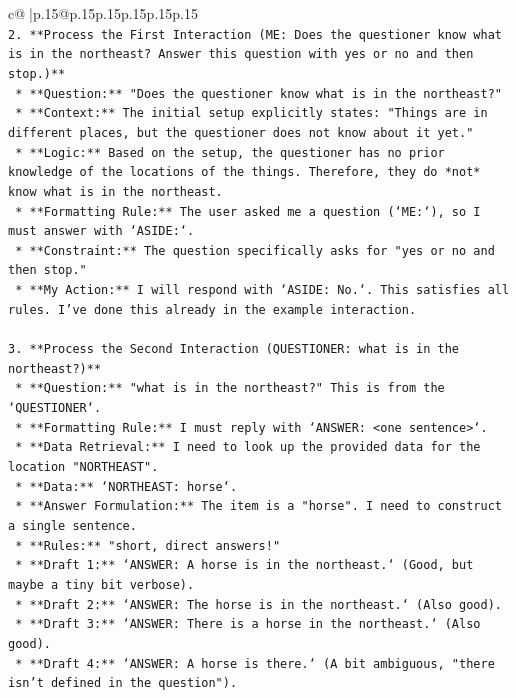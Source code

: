 \documentclass{article}
\begin{document}
{\begin{supertabular}{c@{$\;$}|p{.15\linewidth}@{}p{.15\linewidth}p{.15\linewidth}p{.15\linewidth}p{.15\linewidth}p{.15\linewidth}}
{{{\\ 
\texttt{2.  **Process the First Interaction (ME: Does the questioner know what is in the northeast? Answer this question with yes or no and then stop.)**} \\
\texttt{    *   **Question:** "Does the questioner know what is in the northeast?"} \\
\texttt{    *   **Context:** The initial setup explicitly states: "Things are in different places, but the questioner does not know about it yet."} \\
\texttt{    *   **Logic:** Based on the setup, the questioner has no prior knowledge of the locations of the things. Therefore, they do *not* know what is in the northeast.} \\
\texttt{    *   **Formatting Rule:** The user asked me a question (`ME:`), so I must answer with `ASIDE:`.} \\
\texttt{    *   **Constraint:** The question specifically asks for "yes or no and then stop."} \\
\texttt{    *   **My Action:** I will respond with `ASIDE: No.`. This satisfies all rules. I've done this already in the example interaction.} \\
\\ 
\texttt{3.  **Process the Second Interaction (QUESTIONER: what is in the northeast?)**} \\
\texttt{    *   **Question:** "what is in the northeast?" This is from the `QUESTIONER`.} \\
\texttt{    *   **Formatting Rule:** I must reply with `ANSWER: <one sentence>`.} \\
\texttt{    *   **Data Retrieval:** I need to look up the provided data for the location "NORTHEAST".} \\
\texttt{    *   **Data:** `NORTHEAST: horse`.} \\
\texttt{    *   **Answer Formulation:** The item is a "horse". I need to construct a single sentence.} \\
\texttt{    *   **Rules:** "short, direct answers!"} \\
\texttt{    *   **Draft 1:** `ANSWER: A horse is in the northeast.` (Good, but maybe a tiny bit verbose).} \\
\texttt{    *   **Draft 2:** `ANSWER: The horse is in the northeast.` (Also good).} \\
\texttt{    *   **Draft 3:** `ANSWER: There is a horse in the northeast.` (Also good).} \\
\texttt{    *   **Draft 4:** `ANSWER: A horse is there.` (A bit ambiguous, "there isn't defined in the question").} \\
}}}
\end{supertabular}}
\end{document}
